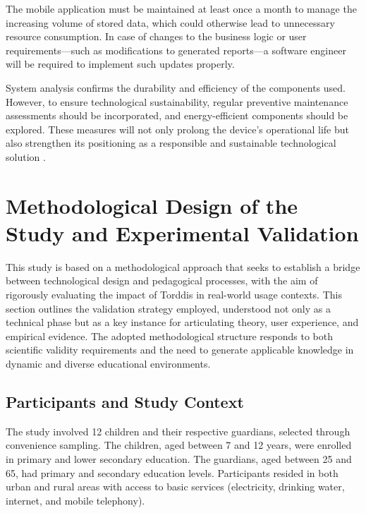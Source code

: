                 The mobile application must be maintained at least once a month to manage the increasing volume of stored data, which could otherwise lead to unnecessary resource consumption. In case of changes to the business logic or user requirements—such as modifications to generated reports—a software engineer will be required to implement such updates properly.
                
                System analysis confirms the durability and efficiency of the components used. However, to ensure technological sustainability, regular preventive maintenance assessments should be incorporated, and energy-efficient components should be explored. These measures will not only prolong the device's operational life but also strengthen its positioning as a responsible and sustainable technological solution \citep{Deng2024Does}.
                
                \section{Methodological Design of the Study and Experimental Validation}
                \label{section:fifth}
                This study is based on a methodological approach that seeks to establish a bridge between technological design and pedagogical processes, with the aim of rigorously evaluating the impact of Torddis in real-world usage contexts. This section outlines the validation strategy employed, understood not only as a technical phase but as a key instance for articulating theory, user experience, and empirical evidence. The adopted methodological structure responds to both scientific validity requirements and the need to generate applicable knowledge in dynamic and diverse educational environments.
                
                \subsection{Participants and Study Context}
                The study involved 12 children and their respective guardians, selected through convenience sampling. The children, aged between 7 and 12 years, were enrolled in primary and lower secondary education. The guardians, aged between 25 and 65, had primary and secondary education levels. Participants resided in both urban and rural areas with access to basic services (electricity, drinking water, internet, and mobile telephony).
                
